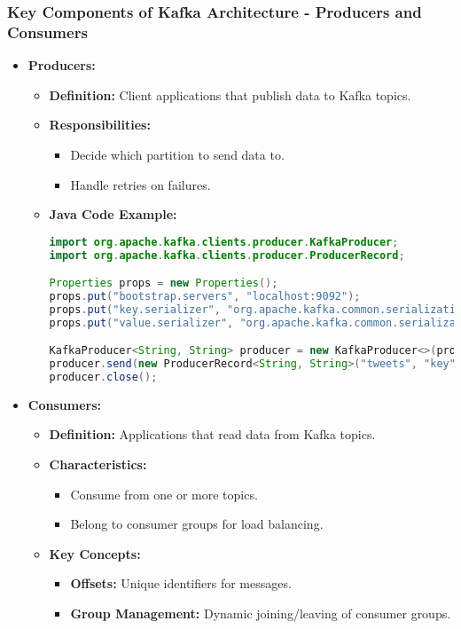 \documentclass[aspectratio=169]{beamer}
\begin{document}
\begin{frame}[fragile]
    \frametitle{Key Components of Kafka Architecture - Producers and Consumers}
    \begin{itemize}
        \item \textbf{Producers:}
        \begin{itemize}
            \item \textbf{Definition:} Client applications that publish data to Kafka topics.
            \item \textbf{Responsibilities:}
            \begin{itemize}
                \item Decide which partition to send data to.
                \item Handle retries on failures.
            \end{itemize}
            \item \textbf{Java Code Example:}
            \begin{lstlisting}[language=Java]
import org.apache.kafka.clients.producer.KafkaProducer;
import org.apache.kafka.clients.producer.ProducerRecord;

Properties props = new Properties();
props.put("bootstrap.servers", "localhost:9092");
props.put("key.serializer", "org.apache.kafka.common.serialization.StringSerializer");
props.put("value.serializer", "org.apache.kafka.common.serialization.StringSerializer");

KafkaProducer<String, String> producer = new KafkaProducer<>(props);
producer.send(new ProducerRecord<String, String>("tweets", "key", "This is a tweet!"));
producer.close();
            \end{lstlisting}
        \end{itemize}
        
        \item \textbf{Consumers:}
        \begin{itemize}
            \item \textbf{Definition:} Applications that read data from Kafka topics.
            \item \textbf{Characteristics:}
            \begin{itemize}
                \item Consume from one or more topics.
                \item Belong to consumer groups for load balancing.
            \end{itemize}
            \item {\textbf{Key Concepts:}}
            \begin{itemize}
                \item \textbf{Offsets:} Unique identifiers for messages.
                \item \textbf{Group Management:} Dynamic joining/leaving of consumer groups.
            \end{itemize}
        \end{itemize}
    \end{itemize}
\end{frame}
\end{document}
